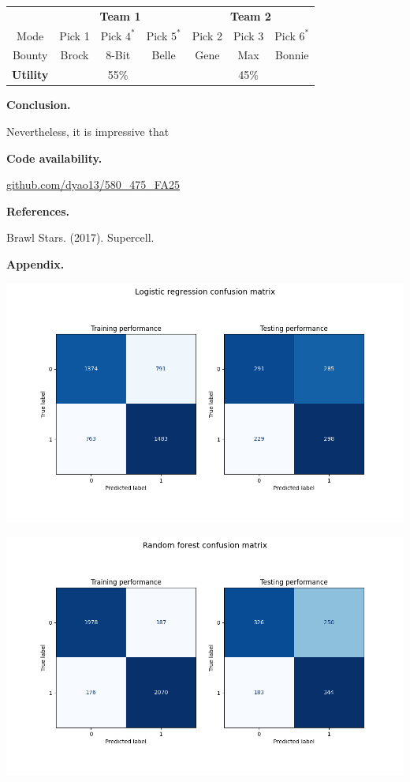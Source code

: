 \documentclass[12pt]{article}
\begin{document}
\begin{center}
\begin{tabular}{c|ccc|ccc}
    & \multicolumn{3}{c|}{\textbf{Team 1}} & \multicolumn{3}{c}{\textbf{Team 2}} \\ 
    Mode & Pick 1 & Pick $4^{*}$ & Pick $5^{*}$ & Pick 2 & Pick 3 & Pick $6^{*}$ \\
    Bounty & Brock & 8-Bit & Belle & Gene & Max & Bonnie \\
    \hline
    \textbf{Utility} & & 55\% & &  & 45\% & 
\end{tabular}
\end{center}

\textbf{Conclusion.}

Nevertheless, it is impressive that 

\textbf{Code availability.}

\href{https://github.com/dyao13/580_475_FA25}{github.com/dyao13/580\_475\_FA25}

\newpage \textbf{References.}

Brawl Stars. (2017). Supercell.

\newpage \textbf{Appendix.}

\begin{center} \includegraphics[width=6in]{"../output/lr_training_testing_confusion_matrices.png"} \end{center}

\begin{center} \includegraphics[width=6in]{"../output/rf_training_testing_confusion_matrices.png"} \end{center}
\end{document}
